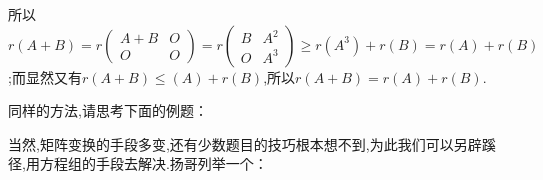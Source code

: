 \documentclass{article}
\begin{document}

所以$r \left(A + B\right)
    =
    r \left(\begin{array}{cc}
            A + B & O \\
            O     & O
        \end{array}\right)
    =
    r \left(\begin{array}{cc}
            B & A^2 \\
            O & A^3
        \end{array}\right)
    \ge
    r \left(A^3\right) + r \left(B\right)
    =
    r \left(A\right) + r \left(B\right)$
;而显然又有$r \left(A + B\right) \le \left(A\right) + r \left(B\right)$,所以$r \left(A + B\right) = r \left(A\right) + r \left(B\right)$.

\vspace{1ex}
同样的方法,请思考下面的例题：

\vspace{1ex}

当然,矩阵变换的手段多变,还有少数题目的技巧根本想不到,为此我们可以另辟蹊径,用方程组的手段去解决.扬哥列举一个：

\vspace{1ex}
\end{document}
